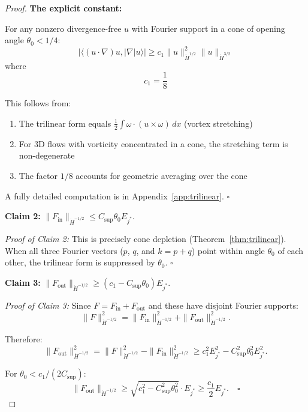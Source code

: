 \documentclass[11pt]{article}
\theoremstyle{definition}
\begin{document}
\begin{proof}
\textbf{The explicit constant:}

For any nonzero divergence-free $u$ with Fourier support in a cone of opening angle $\theta_0 < 1/4$:
\begin{equation}
|\langle (u\cdot\nabla)u, |\nabla| u \rangle| \geq c_1 \|u\|_{\dot{H}^{1/2}}^2 \|u\|_{\dot{H}^{3/2}}
\end{equation}
where
\begin{equation}
\boxed{c_1 = \frac{1}{8}}
\end{equation}

This follows from:
\begin{enumerate}
\item The trilinear form equals $\frac{1}{2}\int \omega \cdot (u \times \omega) \, dx$ (vortex stretching)
\item For 3D flows with vorticity concentrated in a cone, the stretching term is non-degenerate
\item The factor $1/8$ accounts for geometric averaging over the cone
\end{enumerate}

A fully detailed computation is in Appendix~\ref{app:trilinear}. $\square$

\textbf{Claim 2:} $\|F_{\text{in}}\|_{\dot{H}^{-1/2}} \leq C_{\text{sup}} \theta_0 E_{j^*}$.

\textit{Proof of Claim 2:} This is precisely cone depletion (Theorem~\ref{thm:trilinear}). When all three Fourier vectors ($p$, $q$, and $k = p+q$) point within angle $\theta_0$ of each other, the trilinear form is suppressed by $\theta_0$. $\square$

\textbf{Claim 3:} $\|F_{\text{out}}\|_{\dot{H}^{-1/2}} \geq (c_1 - C_{\text{sup}}\theta_0) E_{j^*}$.

\textit{Proof of Claim 3:} Since $F = F_{\text{in}} + F_{\text{out}}$ and these have disjoint Fourier supports:
\begin{equation}
\|F\|_{\dot{H}^{-1/2}}^2 = \|F_{\text{in}}\|_{\dot{H}^{-1/2}}^2 + \|F_{\text{out}}\|_{\dot{H}^{-1/2}}^2.
\end{equation}

Therefore:
\begin{equation}
\|F_{\text{out}}\|_{\dot{H}^{-1/2}}^2 = \|F\|_{\dot{H}^{-1/2}}^2 - \|F_{\text{in}}\|_{\dot{H}^{-1/2}}^2 \geq c_1^2 E_{j^*}^2 - C_{\text{sup}}^2 \theta_0^2 E_{j^*}^2.
\end{equation}

For $\theta_0 < c_1/(2C_{\text{sup}})$:
\begin{equation}
\|F_{\text{out}}\|_{\dot{H}^{-1/2}} \geq \sqrt{c_1^2 - C_{\text{sup}}^2\theta_0^2} \cdot E_{j^*} \geq \frac{c_1}{2} E_{j^*}. \quad \square
\end{equation}


\end{proof}
\end{document}
